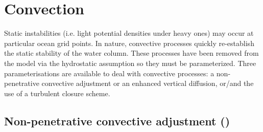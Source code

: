 \documentclass[../main/NEMO_manual]{subfiles}
\begin{document}
\section{Convection}
\label{sec:ZDF_conv}



Static instabilities (i.e. light potential densities under heavy ones) may occur at particular ocean grid points.
In nature, convective processes quickly re-establish the static stability of the water column.
These processes have been removed from the model via the hydrostatic assumption so they must be parameterized.
Three parameterisations are available to deal with convective processes:
a non-penetrative convective adjustment or an enhanced vertical diffusion,
or/and the use of a turbulent closure scheme.

\subsection[Non-penetrative convective adjmt (\protect\np{ln\_tranpc}\forcode{ = .true.})]
				{Non-penetrative convective adjustment (\protect{})}
\label{subsec:ZDF_npc}


\end{document}
